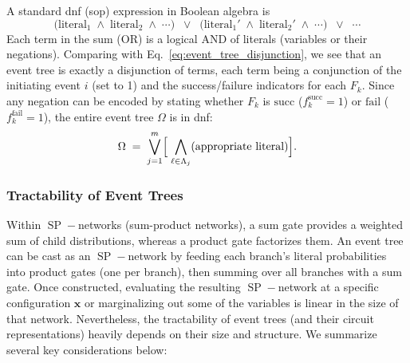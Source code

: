 A standard \acrshort{dnf} (\acrshort{sop}) expression in Boolean algebra is
\[
    \bigl(\text{literal}_1 \;\wedge\;\text{literal}_2 \;\wedge\;\cdots\bigr)
    \;\;\lor\;\;
    \bigl(\text{literal}_{1}' \;\wedge\;\text{literal}_{2}' \;\wedge\;\cdots\bigr)
    \;\;\lor\;\;\cdots
\]
Each term in the sum (OR) is a logical AND of literals (variables or their negations). Comparing with Eq.~\eqref{eq:event_tree_disjunction}, we see that an event tree is exactly a disjunction of terms, each term being a conjunction of the initiating event \(i\) (set to 1) and the success/failure indicators for each \(F_k\). Since any negation can be encoded by stating whether \(F_k\) is \(\text{succ}\) (\(f_k^{\text{succ}}=1\)) or \(\text{fail}\) (\(f_k^{\text{fail}}=1\)), the entire event tree \(\Omega\) is in \acrshort{dnf}:
\[
    \Omega \;=\; 
    \bigvee_{j=1}^m
    \Bigl[
        \;\bigwedge_{\ell\in \Lambda_j}
        (\text{appropriate literal})
    \Bigr].
\]

\subsubsection{Tractability of Event Trees}
\label{sec:tractability_event_trees}

Within \(\operatorname{SP}\!-\)networks (sum-product networks), a sum gate provides a weighted sum of child distributions, whereas a product gate factorizes them.  An event tree can be cast as an \(\operatorname{SP}\!-\)network by feeding each branch's literal probabilities into product gates (one per branch), then summing over all branches with a sum gate.  Once constructed, evaluating the resulting \(\operatorname{SP}\!-\)network at a specific configuration \(\mathbf{x}\) or marginalizing out some of the variables is linear in the size of that network.  Nevertheless, the tractability of event trees (and their circuit representations) heavily depends on their size and structure.  We summarize several key considerations below:

